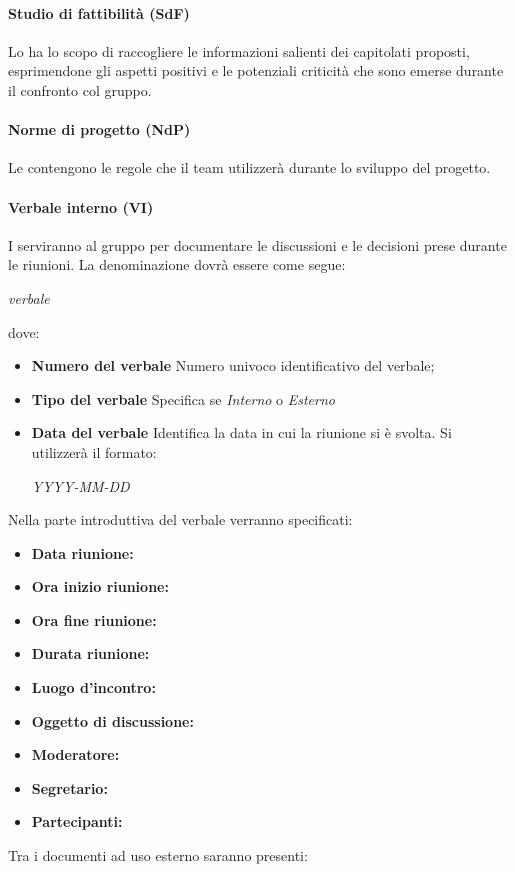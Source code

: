 	\paragraph{Studio di fattibilità (SdF)}
	Lo \SdF{} ha lo scopo di raccogliere le informazioni salienti dei capitolati proposti, esprimendone gli aspetti positivi e 
	le potenziali criticità che sono emerse durante il confronto col gruppo.
	\paragraph{Norme di progetto (NdP)}
	Le \NdP{} contengono le regole che il team utilizzerà durante lo sviluppo del progetto.
	\paragraph{Verbale interno (VI)}
	I \VI{} serviranno al gruppo per documentare le discussioni e le decisioni prese durante le riunioni. 
	La denominazione dovrà essere come segue:\\
	\begin{center}
		\textit{verbale} 
	\end{center}
	dove:
	\begin{itemize}
		\item \textbf{Numero del verbale}
		Numero univoco identificativo del verbale;
		\item \textbf{Tipo del verbale}
		Specifica se \emph{Interno} o \emph{Esterno}
		\item \textbf{Data del verbale}
		Identifica la data in cui la riunione si è svolta. Si utilizzerà il formato:
		\begin{center}
			\emph{YYYY-MM-DD}
		\end{center}
	\end{itemize}
	Nella parte introduttiva del verbale verranno specificati:
	\begin{itemize}
		\item \textbf{Data riunione:}
		\item \textbf{Ora inizio riunione:}
		\item \textbf{Ora fine riunione:}
		\item \textbf{Durata riunione:}
		\item \textbf{Luogo d'incontro:}
		\item \textbf{Oggetto di discussione:}
		\item \textbf{Moderatore:}
		\item \textbf{Segretario:}
		\item \textbf{Partecipanti:}
	\end{itemize}
Tra i documenti ad uso esterno saranno presenti:
